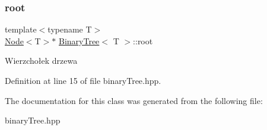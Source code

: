 \subsubsection{\texorpdfstring{root}{root}}
{\footnotesize\ttfamily template$<$typename T$>$ \\
\hyperlink{classNode}{Node}$<$T$>$$\ast$ \hyperlink{classBinaryTree}{Binary\+Tree}$<$ T $>$\+::root\hspace{0.3cm}{\ttfamily [private]}}

Wierzchołek drzewa 

Definition at line 15 of file binary\+Tree.\+hpp.



The documentation for this class was generated from the following file\+:\begin{DoxyCompactItemize}
\item 
binary\+Tree.\+hpp\end{DoxyCompactItemize}
